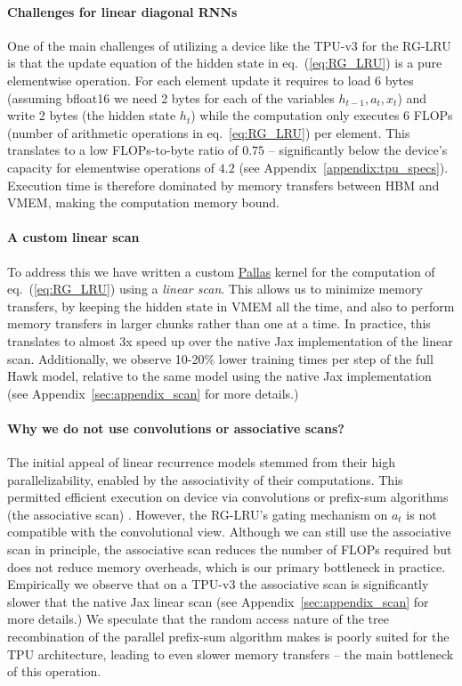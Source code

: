 \paragraph{Challenges for linear diagonal RNNs}

One of the main challenges of utilizing a device like the TPU-v3 for the RG-LRU is that the update equation of the hidden state in eq.~(\ref{eq:RG_LRU}) is a pure elementwise operation. For each element update it requires to load 6 bytes (assuming bfloat16 we need 2 bytes for each of the variables $h_{t-1}, a_t, x_t$) and write 2 bytes (the hidden state $h_t$) while the computation only executes 6 FLOPs (number of arithmetic operations in eq.~\ref{eq:RG_LRU}) per element. This translates to a low FLOPs-to-byte ratio of $0.75$ -- significantly below the device's capacity for elementwise operations of $4.2$ (see Appendix~\ref{appendix:tpu_specs}).
Execution time is therefore dominated by memory transfers between HBM and VMEM, making the computation memory bound.

\paragraph{A custom linear scan}

To address this we have written a custom \href{http://go/jax-pallas}{Pallas} kernel for the computation of eq.~(\ref{eq:RG_LRU}) using a \emph{linear scan}. This allows us to minimize memory transfers, by keeping the hidden state in VMEM all the time, and also to perform memory transfers in larger chunks rather than one at a time. In practice, this translates to almost 3x speed up over the native Jax implementation of the linear scan. Additionally, we observe 10-20\% lower training times per step of the full Hawk model, relative to the same model using the native Jax implementation (see Appendix~\ref{sec:appendix_scan} for more details.)

\paragraph{Why we do not use convolutions or associative scans?}

The initial appeal of linear recurrence models stemmed from their high parallelizability, enabled by the associativity of their computations. This permitted efficient execution on device via convolutions \citep{gu2021combining} or prefix-sum algorithms (the associative scan) \citep{smith2022simplified}. However, the RG-LRU's gating mechanism on $a_t$ is not compatible with the convolutional view. Although we can still use the associative scan in principle, the associative scan reduces the number of FLOPs required but does not reduce memory overheads, which is our primary bottleneck in practice. Empirically we observe that on a TPU-v3 the associative scan is significantly slower that the native Jax linear scan (see Appendix~\ref{sec:appendix_scan} for more details.) We speculate that the random access nature of the tree recombination of the parallel prefix-sum algorithm makes is poorly suited for the TPU architecture, leading to even slower memory transfers -- the main bottleneck of this operation.

